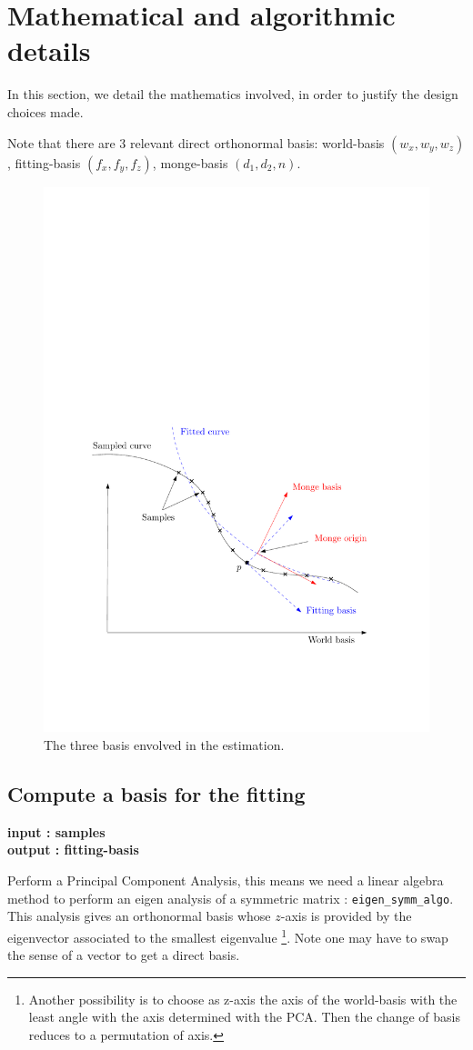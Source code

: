 




\section{Mathematical and algorithmic details}

In this section, we detail the mathematics involved, in order to
justify the design choices made.

Note that there are 3 relevant direct orthonormal basis: world-basis
$(w_x,w_y,w_z)$, fitting-basis $(f_x,f_y,f_z)$, monge-basis
$(d_1,d_2,n)$.

\begin{figure}
\centerline{
\includegraphics[width=.5\linewidth]{jet_fitting_basis}}
\label{fig:jet_fitting_basis}
\caption{The three basis envolved in the estimation.}
\end{figure}
\subsection{Compute a basis for the fitting}

{\bf input : samples\\
output : fitting-basis}

Perform a Principal Component Analysis, this means we need a linear
algebra method to perform an eigen analysis of a symmetric matrix :
{\tt eigen\_symm\_algo}. This analysis gives an orthonormal basis
whose $z$-axis is provided by the eigenvector associated to the smallest
eigenvalue \footnote{Another possibility is to choose as z-axis the
axis of the world-basis with the least angle with the axis determined
with the PCA. Then the change of basis reduces to a permutation of
axis.}. Note one may have to swap the sense of a vector to get a
direct basis.

